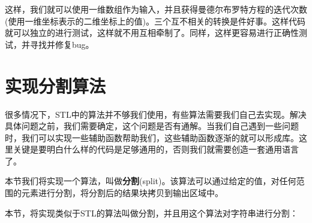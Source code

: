 
这样，我们就可以使用一维数组作为输入，并且获得曼德尔布罗特方程的迭代次数(使用一维坐标表示的二维坐标上的值)。三个互不相关的转换是件好事。这样代码就可以独立的进行测试，这样就不用互相牵制了。同样，这样更容易进行正确性测试，并寻找并修复bug。


\section{实现分割算法}

很多情况下，STL中的算法并不够我们使用，有些算法需要我们自己去实现。解决具体问题之前，我们需要确定，这个问题是否有通解。当我们自己遇到一些问题时，我们可以实现一些辅助函数帮助我们，这些辅助函数逐渐的就可以形成库。这里关键是要明白什么样的代码是足够通用的，否则我们就需要创造一套通用语言了。

本节我们将实现一个算法，叫做\textbf{分割}(split)。该算法可以通过给定的值，对任何范围的元素进行分割，将分割后的结果块拷贝到输出区域中。


本节，将实现类似于STL的算法叫做分割，并且用这个算法对字符串进行分割：

